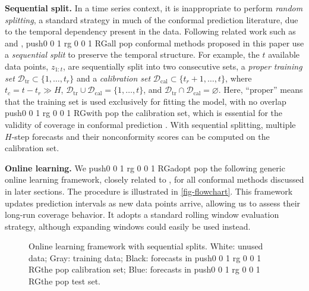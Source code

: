 \documentclass[
  american,
  12pt]{article}
\theoremstyle{plain}
\theoremstyle{plain}
\theoremstyle{remark}
\newcommand{\CPTSadd}[1]{\ifmmode\else\leavevmode\fi\pdfcolorstack 0 push{0 0 1 rg 0 0 1 RG}#1\pdfcolorstack 0 pop}
\begin{document}
\textbf{Sequential split.} In a time series context, it is inappropriate
to perform \emph{random splitting}, a standard strategy in much of the
conformal prediction literature, due to the temporal dependency present
in the data. Following related work such as \citet{wisniewski2020} and
\citet{zaffran2022}, \CPTSadd{all} conformal methods proposed in this paper use a
\emph{sequential split} to preserve the temporal structure. For example,
the \(t\) available data points, \(z_{1:t}\), are sequentially split
into two consecutive sets, a \emph{proper training set}
\(\mathcal{D}_{\text{tr}} \subset \{1, \dots, t_r\}\) and a
\emph{calibration set}
\(\mathcal{D}_{\text{cal}} \subset \{t_r+1, \dots, t\}\), where
\(t_c=t-t_r \gg H\),
\(\mathcal{D}_{\text{tr}} \cup \mathcal{D}_{\text{cal}} = \{1, \dots, t\}\),
and
\(\mathcal{D}_{\text{tr}} \cap \mathcal{D}_{\text{cal}} = \varnothing\).
Here, ``proper'' means that the training set is used exclusively for
fitting the model, with no overlap \CPTSadd{with} the calibration set, which is
essential for the validity of coverage in conformal prediction
\citep{papadopoulos2002, vovk2005}. With sequential splitting, multiple
\(H\)-step forecasts and their nonconformity scores can be computed on
the calibration set.

\textbf{Online learning.} We \CPTSadd{adopt} the following generic online learning
framework, closely related to \citet{zaffran2022}, for all conformal
methods discussed in later sections. The procedure is illustrated in
\autoref{fig-flowchart}. This framework updates prediction intervals as
new data points arrive, allowing us to assess their long-run coverage
behavior. It adopts a standard rolling window evaluation strategy,
although expanding windows could easily be used instead.

\begin{figure}[!hbtp]
\vspace*{-1.5cm}
\hspace*{-2.5cm}
\centering
\scalebox{0.85}{
  
}
\vspace*{-0.5cm}

\caption{Online learning framework with sequential splits. White: unused data; Gray: training data; Black: forecasts in \CPTSadd{the} calibration set; Blue: forecasts in \CPTSadd{the} test set.}\label{fig-flowchart}
\end{figure}
\end{document}
